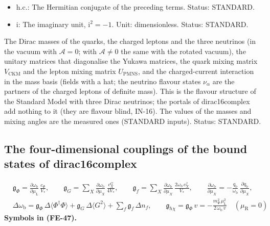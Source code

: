 \documentclass[
  10pt,
]{article}
\begin{document}
\begin{itemize}
  \(\hat\gamma^\mu\): The four-dimensional complex \(4 \times 4\) Dirac
  matrices of the fold: \(\hat\gamma^{(a)}\) along the frame directions
  of the fold and \(\hat\gamma^\mu\) along its coordinates (the frame
  matrices contracted with the inverse frame field of the fold),
  \(\{\hat\gamma^\mu, \hat\gamma^\nu\} = -2\hat h^{\mu\nu}\mathbf{1}\);
  \(\hat\gamma_\mu = \hat h_{\mu\nu}\hat\gamma^\nu\). Unit:
  dimensionless. Status: STANDARD.
\item
  \(\mathrm{h.c.}\): The Hermitian conjugate of the preceding terms.
  Status: STANDARD.
\item
  \(\mathrm{i}\): The imaginary unit, \(\mathrm{i}^2 = -1\). Unit:
  dimensionless. Status: STANDARD.
\end{itemize}

The Dirac masses of the quarks, the charged leptons and the three
neutrinos (in the vacuum with \(\mathcal{A} = 0\); with
\(\mathcal{A} \ne 0\) the same with the rotated vacuum), the unitary
matrices that diagonalise the Yukawa matrices, the quark mixing matrix
\(V_{\mathrm{CKM}}\) and the lepton mixing matrix \(U_{\mathrm{PMNS}}\),
and the charged-current interaction in the mass basis (fields with a
hat; the neutrino flavour states \(\nu_\alpha\) are the partners of the
charged leptons of definite mass). This is the flavour structure of the
Standard Model with three Dirac neutrinos; the portals of dirac16complex
add nothing to it (they are flavour blind, IN-16). The values of the
masses and mixing angles are the measured ones (STANDARD inputs).
Status: STANDARD.

\hypertarget{the-four-dimensional-couplings-of-the-bound-states-of-dirac16complex}{%
\subsection{The four-dimensional couplings of the bound states of
dirac16complex}\label{the-four-dimensional-couplings-of-the-bound-states-of-dirac16complex}}

\[
\begin{aligned}
&\mathfrak{g}_{\Phi} = \frac{\partial\omega_{\mathrm{b}}}{\partial\mu_{\mathrm{L}}}\,\frac{c_\Phi}{V_*},\qquad
 \mathfrak{g}_{G} = \sum_X\frac{\partial\omega_{\mathrm{b}}}{\partial\mu_X}\,\frac{c^{G}_X}{4V_*},\qquad
 \mathfrak{g}_{f} = \sum_X\frac{\partial\omega_{\mathrm{b}}}{\partial\mu_X}\,\frac{2\omega_{\mathrm{b}}\,c^{f}_X}{V_*},\qquad
 \frac{\partial\omega_{\mathrm{b}}}{\partial\mu_X} = -\frac{q_{\mathrm{b}}}{\omega_{\mathrm{b}}}\,\frac{\partial q_{\mathrm{b}}}{\partial\mu_X},\\
&\Delta\omega_{\mathrm{b}} = \mathfrak{g}_{\Phi}\,\Delta\langle\Phi^\dagger\Phi\rangle + \mathfrak{g}_{G}\,\Delta\langle G^2\rangle + \sum_f\mathfrak{g}_{f}\,\Delta n_f,\qquad
 \mathfrak{g}_{h\chi} = \mathfrak{g}_{\Phi}\,v = -\frac{m_\Psi^2\,\mu_{\mathrm{L}}^2}{2\,\omega_{\mathrm{b}}\,v}\quad(\mu_{\mathrm{R}} = 0)
\end{aligned} \tag{FE-47}
\] \textbf{Symbols in (FE-47).}
\end{document}
